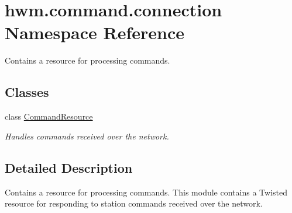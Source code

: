 \hypertarget{namespacehwm_1_1command_1_1connection}{\section{hwm.\-command.\-connection Namespace Reference}
\label{namespacehwm_1_1command_1_1connection}
}


Contains a resource for processing commands.  


\subsection*{Classes}
\begin{DoxyCompactItemize}
\item 
class \hyperlink{classhwm_1_1command_1_1connection_1_1_command_resource}{Command\-Resource}
\begin{DoxyCompactList}\small\item\em Handles commands received over the network. \end{DoxyCompactList}\end{DoxyCompactItemize}


\subsection{Detailed Description}
Contains a resource for processing commands. This module contains a Twisted resource for responding to station commands received over the network. 